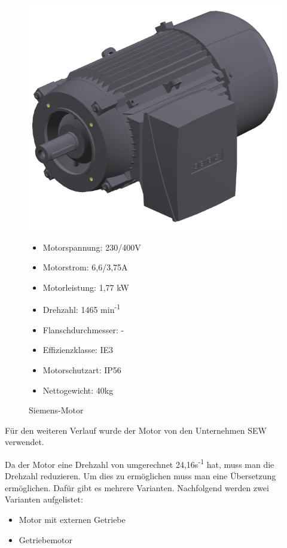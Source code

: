 \documentclass[12pt]{scrreprt} %
\begin{document}
\begin{figure}[!ht]
\begin{minipage}[t]{0.45\textwidth}
\vspace{-\ht\strutbox}\includegraphics[width=\textwidth]{SiemensMotor}
\caption{Siemens-Motor}

\begin{itemize}
	\item{Motorspannung: 230/400V}
	\item{Motorstrom: 6,6/3,75A}
	\item{Motorleistung: 1,77 kW}
	\item{Drehzahl: 1465 min\textsuperscript{-1}}
	\item{Flanschdurchmesser: -}
	\item{Effizienzklasse: IE3}
	\item{Motorschutzart: IP56}
	\item{Nettogewicht: 40kg}
\end{itemize}

\end{minipage}
\end{figure}

Für den weiteren Verlauf wurde der Motor von den Unternehmen SEW verwendet.

Da der Motor eine Drehzahl von umgerechnet 24,16s\textsuperscript{-1} hat, muss man die Drehzahl reduzieren. Um dies zu ermöglichen muss man eine Übersetzung ermöglichen. Dafür gibt es mehrere Varianten. Nachfolgend werden zwei Varianten aufgelistet:

\begin{itemize}
	\item{Motor mit externen Getriebe}
	\item{Getriebemotor}
\end{itemize}
\end{document}

